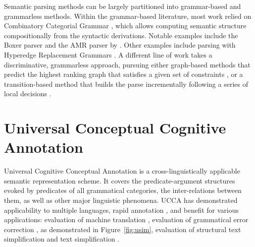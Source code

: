 \documentclass[12pt,a4paper,table]{report}
\begin{document}
Semantic parsing methods can be largely partitioned into grammar-based and grammarless methods.
Within the grammar-based literature, most work relied on Combinatory Categorial Grammar
\citep[CCG]{Steedman:00}, which allows computing semantic structure compositionally from the
syntactic derivations. Notable examples include the Boxer parser \citep{bos2005towards}
and the AMR parser by \citep{artzi2015broad}.
Other examples include parsing with Hyperedge Replacement Grammars
\citep{jones2012semantics}.
A different line of work takes a discriminative, grammarless approach,
pursuing either graph-based methods that predict the highest ranking graph
that satisfies a given set of constraints
\citep[for AMR parsing]{flanigan2014discriminative},
or a transition-based method
that builds the parse incrementally following a series of local
decisions \citep{Nivre03anefficient}.

\section{Universal Conceptual Cognitive Annotation}\label{sec:intro_ucca}

Universal Cognitive Conceptual Annotation \citep[UCCA;][]{abend2013universal}
is a cross-linguistically applicable semantic representation scheme.
It covers the predicate-argument
structures evoked by predicates of all grammatical categories, the inter-relations between them,
as well as other major linguistic phenomena.
UCCA has demonstrated applicability to multiple languages,
rapid annotation \citep{abend2017uccaapp},
and benefit for various applications:
evaluation of machine translation \citep{birch2016hume},
evaluation of grammatical error correction \citep{choshen2018reference},
as demonstrated in Figure~\ref{fig:usim},
evaluation of structural text simplification \citep{sulem2018semantic}
and text simplification \citep{sulem2018simple}.
\end{document}
